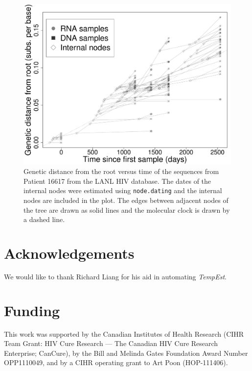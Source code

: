 \documentclass{bioinfo}
\newcommand{\code}[1]{{\tt #1}}
\begin{document}
\begin{figure}[t]
	\centering
	\includegraphics[width=\columnwidth]{Patient_16617_gray}
	\caption[Genetic distance versus time plot]{Genetic distance from the root versus time of the sequences from Patient 16617 from the LANL HIV database. The dates of the internal nodes were estimated using \code{node.dating} and the internal nodes are included in the plot. The edges between adjacent nodes of the tree are drawn as solid lines and the molecular clock is drawn by a dashed line.}
	\label{fig:pat16617}
\end{figure}

\section*{Acknowledgements} \label{sec:ackn}
We would like to thank Richard Liang for his aid in automating \emph{TempEst}.
\newpage

\section*{Funding} \label{sec:fund}
This work was supported by the Canadian Institutes of Health Research (CIHR Team Grant: HIV Cure Research --- The Canadian HIV Cure Research Enterprise; CanCure), by the Bill and Melinda Gates Foundation Award Number OPP1110049, and by a CIHR operating grant to Art Poon (HOP-111406).



\end{document}
